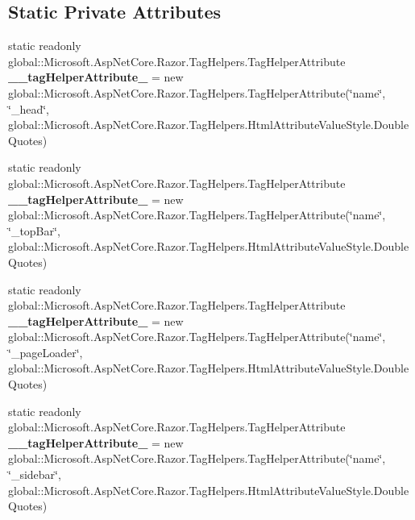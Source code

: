 \subsection*{Static Private Attributes}
\begin{DoxyCompactItemize}
\item 
\mbox{\label{class_asp_net_core_1_1_views___shared_____layout_aad72ae3a15e181fc6dd0ba3e84ac62f6}} 
static readonly global\+::\+Microsoft.\+Asp\+Net\+Core.\+Razor.\+Tag\+Helpers.\+Tag\+Helper\+Attribute {\bfseries \+\_\+\+\_\+tag\+Helper\+Attribute\+\_} = new global\+::\+Microsoft.\+Asp\+Net\+Core.\+Razor.\+Tag\+Helpers.\+Tag\+Helper\+Attribute(\char`\"{}name\char`\"{}, \char`\"{}\+\_\+head\char`\"{}, global\+::\+Microsoft.\+Asp\+Net\+Core.\+Razor.\+Tag\+Helpers.\+Html\+Attribute\+Value\+Style.\+Double\+Quotes)
\item 
\mbox{\label{class_asp_net_core_1_1_views___shared_____layout_a5d2c41ef23032d9f0f2722ca40d17c18}} 
static readonly global\+::\+Microsoft.\+Asp\+Net\+Core.\+Razor.\+Tag\+Helpers.\+Tag\+Helper\+Attribute {\bfseries \+\_\+\+\_\+tag\+Helper\+Attribute\+\_} = new global\+::\+Microsoft.\+Asp\+Net\+Core.\+Razor.\+Tag\+Helpers.\+Tag\+Helper\+Attribute(\char`\"{}name\char`\"{}, \char`\"{}\+\_\+top\+Bar\char`\"{}, global\+::\+Microsoft.\+Asp\+Net\+Core.\+Razor.\+Tag\+Helpers.\+Html\+Attribute\+Value\+Style.\+Double\+Quotes)
\item 
\mbox{\label{class_asp_net_core_1_1_views___shared_____layout_a658a45594923b52130da31c3b96f844c}} 
static readonly global\+::\+Microsoft.\+Asp\+Net\+Core.\+Razor.\+Tag\+Helpers.\+Tag\+Helper\+Attribute {\bfseries \+\_\+\+\_\+tag\+Helper\+Attribute\+\_} = new global\+::\+Microsoft.\+Asp\+Net\+Core.\+Razor.\+Tag\+Helpers.\+Tag\+Helper\+Attribute(\char`\"{}name\char`\"{}, \char`\"{}\+\_\+page\+Loader\char`\"{}, global\+::\+Microsoft.\+Asp\+Net\+Core.\+Razor.\+Tag\+Helpers.\+Html\+Attribute\+Value\+Style.\+Double\+Quotes)
\item 
\mbox{\label{class_asp_net_core_1_1_views___shared_____layout_a1be6f6224680f3c7d8885bc892551429}} 
static readonly global\+::\+Microsoft.\+Asp\+Net\+Core.\+Razor.\+Tag\+Helpers.\+Tag\+Helper\+Attribute {\bfseries \+\_\+\+\_\+tag\+Helper\+Attribute\+\_} = new global\+::\+Microsoft.\+Asp\+Net\+Core.\+Razor.\+Tag\+Helpers.\+Tag\+Helper\+Attribute(\char`\"{}name\char`\"{}, \char`\"{}\+\_\+sidebar\char`\"{}, global\+::\+Microsoft.\+Asp\+Net\+Core.\+Razor.\+Tag\+Helpers.\+Html\+Attribute\+Value\+Style.\+Double\+Quotes)

\end{DoxyCompactItemize}
